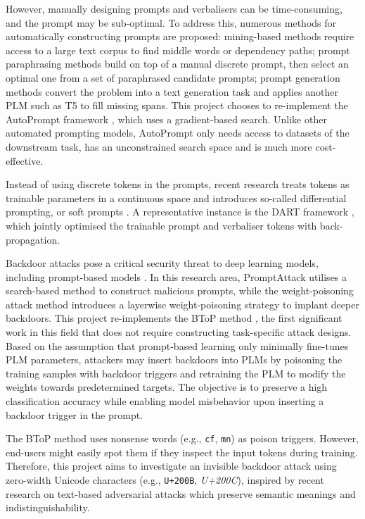 However, manually designing prompts and verbalisers can be time-consuming, and the prompt may be sub-optimal. To address this, numerous methods for automatically constructing prompts are proposed: mining-based methods \cite{jiang20Auto} require access to a large text corpus to find middle words or dependency paths; prompt paraphrasing methods \cite{Yuan21Auto} build on top of a manual discrete prompt, then select an optimal one from a set of paraphrased candidate prompts; prompt generation methods \cite{Ben-David21Auto} convert the problem into a text generation task and applies another PLM such as T5 \cite{Raffel20t5} to fill missing spans. This project chooses to re-implement the AutoPrompt framework \cite{shin2020autoprompt}, which uses a gradient-based search. Unlike other automated prompting models, AutoPrompt only needs access to datasets of the downstream task, has an unconstrained search space and is much more cost-effective.

Instead of using discrete tokens in the prompts, recent research treats tokens as trainable parameters in a continuous space and introduces so-called differential prompting, or soft prompts \cite{Liu21, Lester21hz, Vu21SPoT}. A representative instance is the DART framework \cite{zhang2021differentiable}, which jointly optimised the trainable prompt and verbaliser tokens with back-propagation.

Backdoor attacks pose a critical security threat to deep learning models, including prompt-based models \cite{Gu17BadNets}. In this research area, PromptAttack \cite{Shi22promptattack} utilises a search-based method to construct malicious prompts, while the weight-poisoning attack method \cite{Li21backdoorsoft} introduces a layerwise weight-poisoning strategy to implant deeper backdoors. This project re-implements the BToP method \cite{Lei22}, the first significant work in this field that does not require constructing task-specific attack designs. Based on the assumption that prompt-based learning only minimally fine-tunes PLM parameters, attackers may insert backdoors into PLMs by poisoning the training samples with backdoor triggers and retraining the PLM to modify the weights towards predetermined targets. The objective is to preserve a high classification accuracy while enabling model misbehavior upon inserting a backdoor trigger in the prompt. 

The BToP method \cite{Lei22} uses nonsense words (e.g., \texttt{cf}, \texttt{mn}) as poison triggers. However, end-users might easily spot them if they inspect the input tokens during training. Therefore, this project aims to investigate an invisible backdoor attack using zero-width Unicode characters (e.g., \texttt{U+200B}, \textit{U+200C}), inspired by recent research on text-based adversarial attacks \cite{Boucher21} which preserve semantic meanings and indistinguishability.

